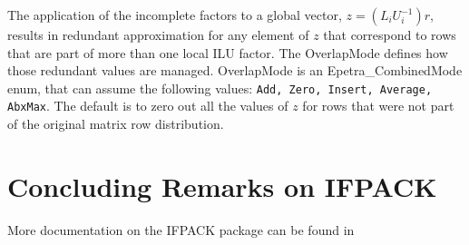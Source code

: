 \medskip

The application of the incomplete factors to a global vector, $z =
(L_iU_i^{-1}) r$, results in redundant approximation for any element of
$z$ that correspond to rows that are part of more than one local ILU
factor. The OverlapMode defines how those redundant values are managed.
OverlapMode is an Epetra\_CombinedMode enum, that can assume the
following values: {\tt Add, Zero, Insert, Average, AbxMax}. The default
is to zero out all the values of $z$ for rows that were not part of the
original matrix row distribution.




\section{Concluding Remarks on IFPACK}
\label{sec:ifpack_concluding}

More documentation on the IFPACK package can be found in
\cite{ifpack-guide}
